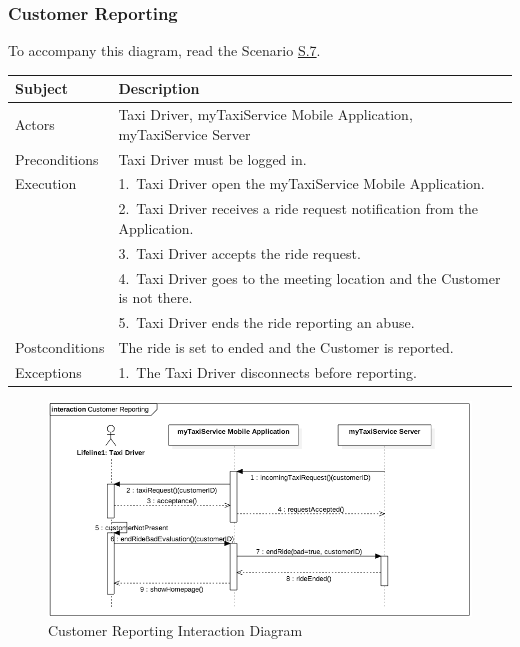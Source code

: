 \subsubsection{Customer Reporting}
			To accompany this diagram, read the Scenario \hyperref[sec:CustomerReportingScenario]{S.7}.

				\begin{table}[htpb]
					\centering
					\label{tab:CustomerReportingDiagramTable}
					\begin{tabularx}{\textwidth}{lp{9cm}}
						\hline
						\hline
							\textbf{Subject}
						& 
							\textbf{Description}\\
						\hline
							Actors	       &  Taxi Driver, myTaxiService Mobile Application, myTaxiService Server\\
						\hline
							Preconditions  &  Taxi Driver must be logged in.\\
						\hline
							Execution      &  1.~Taxi Driver open the myTaxiService Mobile Application.\\
										   &  2.~Taxi Driver receives a ride request notification from the Application.\\
										   &  3.~Taxi Driver accepts the ride request.\\
										   &  4.~Taxi Driver goes to the meeting location and the Customer is not there.\\
										   &  5.~Taxi Driver ends the ride reporting an abuse.\\
						\hline
							Postconditions &  The ride is set to ended and the Customer is reported.\\
						\hline
							Exceptions     &  1.~The Taxi Driver disconnects before reporting.\\
									
						\hline
						\hline
					\end{tabularx}
				\end{table}
				
				\begin{figure}[H]
					\centering
					\includegraphics[width=\textwidth, scale=0.5]{IMG/InteractionDiagrams/CustomerReporting.png}
					\caption{Customer Reporting Interaction Diagram}\label{sec:FigureCustomerReporting}
				\end{figure}